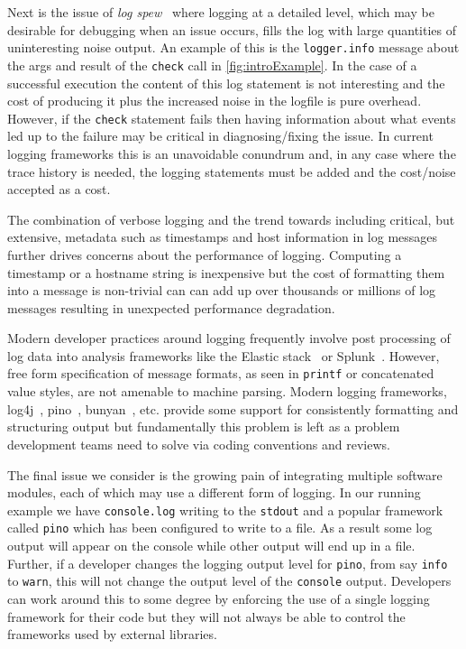 \documentclass[sigplan,10pt]{acmart}
\begin{document}
Next is the issue of \emph{log spew}~\cite{learnlog,logstudy2} where logging at a detailed level, which 
may be desirable for debugging when an issue occurs, fills the log with 
large quantities of uninteresting noise output. An example of this is the 
\texttt{logger.info} message about the args and result of the \texttt{check} 
call in \autoref{fig:introExample}. In the case of a successful execution the content of this log statement 
is not interesting and the cost of producing it plus the increased noise in 
the logfile is pure overhead. However, if the \texttt{check} statement fails 
then having information about what events led up to the failure may be 
critical in diagnosing/fixing the issue. In current logging frameworks this is 
an unavoidable conundrum and, in any case where the trace history is needed, 
the logging statements must be added and the cost/noise accepted as a cost.

The combination of verbose logging and the trend towards including critical, but 
extensive, metadata such as timestamps and host information in log messages further 
drives concerns about the performance of logging. Computing a timestamp or a 
hostname string is inexpensive but the cost of formatting them into a message is 
non-trivial can can add up over thousands or millions of log messages resulting 
in unexpected performance degradation. 

Modern developer practices around logging frequently involve post processing 
of log data into analysis frameworks like the Elastic stack~\cite{elastic} or Splunk~\cite{splunk}. 
However, free form specification of message formats, as seen in \texttt{printf} or 
concatenated value styles, are not amenable to machine parsing. Modern logging 
frameworks, log4j~\cite{log4j}, pino~\cite{pino}, bunyan~\cite{bunyan}, etc. 
provide some support for consistently formatting and structuring output but
fundamentally this problem is left as a problem development teams need to solve
via coding conventions and reviews.

The final issue we consider is the growing pain of integrating multiple software 
modules, each of which may use a different form of logging. In our running example 
we have \texttt{console.log} writing to the \texttt{stdout} and a
popular framework called \texttt{pino} which has been configured to write to
a file. As a result some log output will appear on the console while other
output will end up in a file. Further, if a developer changes the logging output
level for \texttt{pino}, from say \texttt{info} to \texttt{warn}, this will
not change the output level of the \texttt{console} output. Developers can work
around this to some degree by enforcing the use of a single logging framework
for their code but they will not always be able to control the frameworks used
by external libraries.
\end{document}
